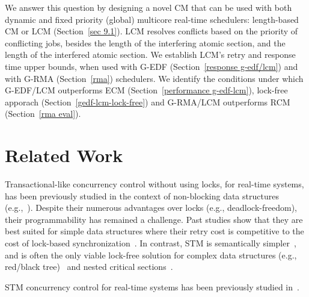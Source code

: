 \documentclass[conference]{IEEEtran}
\begin{document}
We answer this question by designing a novel CM that can be used with both dynamic and fixed priority (global) multicore real-time schedulers: length-based CM or LCM (Section~\ref{sec 9.1}). LCM resolves conflicts based on the priority of conflicting jobs, besides the length of the interfering atomic section, and the length of the interfered atomic section.  We establish LCM's retry and response time upper bounds, when used with G-EDF (Section~\ref{response g-edf/lcm}) and with G-RMA (Section~\ref{rma}) schedulers. We identify the conditions under which G-EDF/LCM outperforms ECM (Section~\ref{performance g-edf-lcm}), lock-free apporach (Section~\ref{gedf-lcm-lock-free}) and G-RMA/LCM outperforms RCM (Section~\ref{rma eval}). 

\section{Related Work}
\label{sec:past}

Transactional-like concurrency control without using locks, for real-time systems, has been previously studied in the context of non-blocking data structures (e.g.,~\cite{anderson95realtime}). Despite their numerous advantages over locks 
(e.g., deadlock-freedom), 
their programmability has remained a challenge. 
Past studies show that they are best suited for simple data structures where their retry cost is competitive to the cost of lock-based synchronization~\cite{bc+08}.  In contrast, STM is semantically simpler~\cite{Herlihy:2006:AMP:1146381.1146382}, and is often the only viable lock-free solution for complex data structures (e.g., red/black tree)~\cite{key-1} and nested critical sections~\cite{Saha:2006:MHP:1122971.1123001}.

STM concurrency control for real-time systems has been previously studied in~\cite{manson2006preemptible,fahmy2009bounding,sarni2009real,schoeberl2010rttm,key-1,barrosmanaging,stmconcurrencycontrol:emsoft11}.
\end{document}

